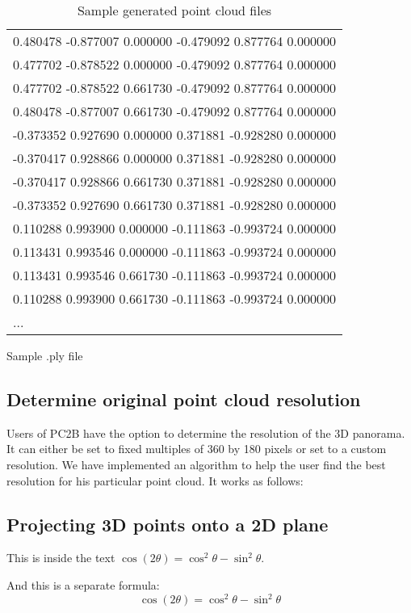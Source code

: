 \begin{table}[h]
\begin{subtable}[b]{0.52\textwidth}
{\begin{tabular}{l}
			0.480478 -0.877007 0.000000 -0.479092 0.877764 0.000000 \\
			0.477702 -0.878522 0.000000 -0.479092 0.877764 0.000000 \\
			0.477702 -0.878522 0.661730 -0.479092 0.877764 0.000000 \\
			0.480478 -0.877007 0.661730 -0.479092 0.877764 0.000000 \\
			-0.373352 0.927690 0.000000 0.371881 -0.928280 0.000000 \\
			-0.370417 0.928866 0.000000 0.371881 -0.928280 0.000000 \\
			-0.370417 0.928866 0.661730 0.371881 -0.928280 0.000000 \\
			-0.373352 0.927690 0.661730 0.371881 -0.928280 0.000000 \\
			0.110288 0.993900 0.000000 -0.111863 -0.993724 0.000000 \\
			0.113431 0.993546 0.000000 -0.111863 -0.993724 0.000000 \\
			0.113431 0.993546 0.661730 -0.111863 -0.993724 0.000000 \\
			0.110288 0.993900 0.661730 -0.111863 -0.993724 0.000000 \\
			...
			
		\end{tabular}}
		\caption{Sample .ply file}
		\label{tab:ply_file}
	\end{subtable}
	\caption{Sample generated point cloud files}
	\label{tab:xyz_ply_file_structure}
\end{table}

\subsection{Determine original point cloud resolution}

Users of PC2B have the option to determine the resolution of the 3D panorama. It can either be set to fixed multiples of 360 by 180 pixels or set to a custom resolution. We have implemented an algorithm to help the user find the best resolution for his particular point cloud. It works as follows:

\subsection{Projecting 3D points onto a 2D plane}

This is inside the text $\cos (2\theta) = \cos^2 \theta - \sin^2 \theta$.


And this is a separate formula:
$$\cos (2\theta) = \cos^2 \theta - \sin^2 \theta$$


